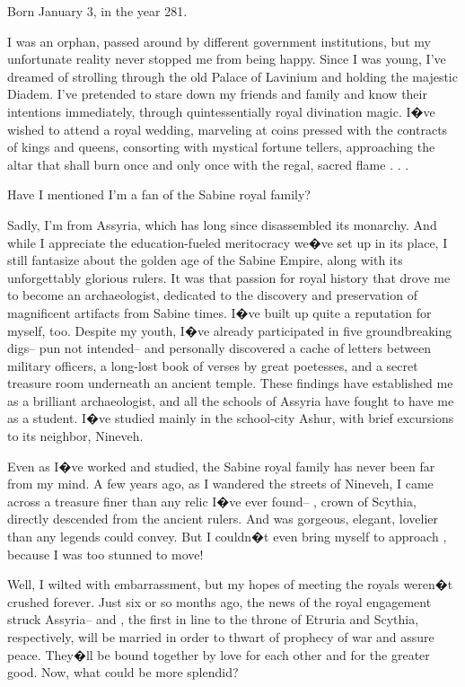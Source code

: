 \documentclass[char]{Kos}
\begin{document}
\name{\cArcheologist{}}

Born January 3, in the year 281.

I was an orphan, passed around by different government institutions, but my unfortunate reality never stopped me from being happy. Since I was young, I've dreamed of strolling through the old Palace of Lavinium and holding the majestic Diadem. I've pretended to stare down my friends and family and know their intentions immediately, through quintessentially royal divination magic. I�ve wished to attend a royal wedding, marveling at coins pressed with the contracts of kings and queens, consorting with mystical fortune tellers, approaching the altar that shall burn once and only once with the regal, sacred flame . . .

Have I mentioned I'm a fan of the Sabine royal family?

Sadly, I'm from Assyria, which has long since disassembled its monarchy. And while I appreciate the education-fueled meritocracy we�ve set up in its place, I still fantasize about the golden age of the Sabine Empire, along with its unforgettably glorious rulers. It was that passion for royal history that drove me to become an archaeologist, dedicated to the discovery and preservation of magnificent artifacts from Sabine times. I�ve built up quite a reputation for myself, too. Despite my youth, I�ve already participated in five groundbreaking digs-- pun not intended-- and personally discovered a cache of letters between military officers, a long-lost book of verses by great poetesses, and a secret treasure room underneath an ancient temple. These findings have established me as a brilliant archaeologist, and all the schools of Assyria have fought to have me as a student. I�ve studied mainly in the school-city Ashur, with brief excursions to its neighbor, Nineveh.

Even as I�ve worked and studied, the Sabine royal family has never been far from my mind. A few years ago, as I wandered the streets of Nineveh, I came across a treasure finer than any relic I�ve ever found-- \cBride{\name}, crown \cBride{\prince} of Scythia, directly descended from the ancient rulers. And \cBride{\they} was gorgeous, elegant, lovelier than any legends could convey. But I couldn�t even bring myself to approach \cBride{\them}, because I was too stunned to move!

Well, I wilted with embarrassment, but my hopes of meeting the royals weren�t crushed forever. Just six or so months ago, the news of the royal engagement struck Assyria-- \cBride{\nickname} and \cGroom{\name}, the first in line to the throne of Etruria and Scythia, respectively, will be married in order to thwart of prophecy of war and assure peace. They�ll be bound together by love for each other and for the greater good. Now, what could be more splendid?
\end{document}
